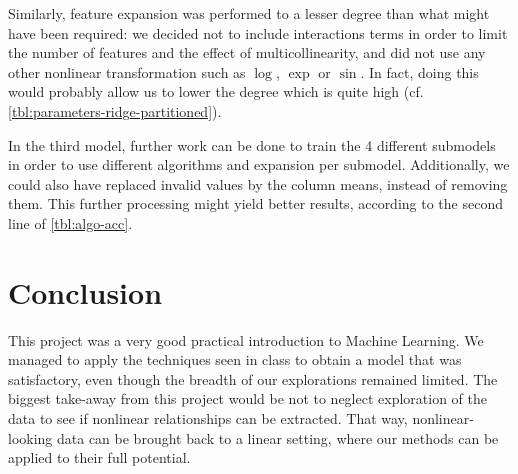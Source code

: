 \documentclass[10pt,conference,compsocconf]{IEEEtran}
\begin{document}
Similarly, feature expansion was performed to a lesser degree than
what might have been required: we decided not to include interactions
terms in order to limit the number of features and the effect of
multicollinearity, and did not use any other nonlinear transformation
such as $\log$, $\exp$ or $\sin$.
In fact, doing this would probably allow us to lower the degree which is quite high (cf. \autoref{tbl:parameters-ridge-partitioned}).

In the third model, further work can be done to train the 4 different submodels in order to use different algorithms and expansion per submodel.
Additionally, we could also have replaced invalid
values by the column means, instead of removing them.
This further processing might yield better results,
according to the second line of \autoref{tbl:algo-acc}.


\section{Conclusion}

This project was a very good practical introduction to Machine Learning. We
managed to apply the techniques seen in class to obtain a model that was
satisfactory, even though the breadth of our explorations remained limited.
The biggest take-away from this project would be not to neglect exploration
of the data to see if nonlinear relationships can be extracted. That way,
nonlinear-looking data can be brought back to a linear setting, where
our methods can be applied to their full potential.


%
%
\end{document}
